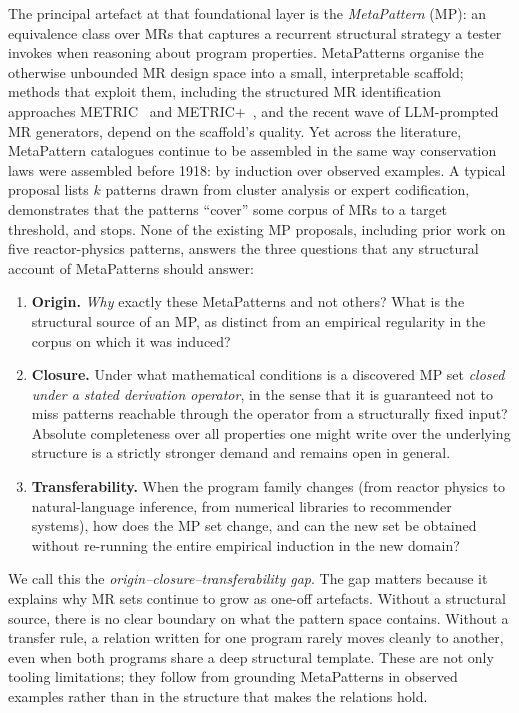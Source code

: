 \documentclass[acmsmall,screen,review]{acmart}
\begin{document}
The principal artefact at that foundational layer is the \emph{MetaPattern} (MP): an equivalence class over MRs that captures a recurrent structural strategy a tester invokes when reasoning about program properties. MetaPatterns organise the otherwise unbounded MR design space into a small, interpretable scaffold; methods that exploit them, including the structured MR identification approaches METRIC~\cite{ChenMETRIC2016} and METRIC+~\cite{SunMETRICplus2021}, and the recent wave of LLM-prompted MR generators, depend on the scaffold's quality. Yet across the literature, MetaPattern catalogues continue to be assembled in the same way conservation laws were assembled before 1918: by induction over observed examples. A typical proposal lists $k$ patterns drawn from cluster analysis or expert codification, demonstrates that the patterns ``cover'' some corpus of MRs to a target threshold, and stops. None of the existing MP proposals, including prior work on five reactor-physics patterns, answers the three questions that any structural account of MetaPatterns should answer:

\begin{enumerate}
  \item \textbf{Origin.} \emph{Why} exactly these MetaPatterns and not others? What is the structural source of an MP, as distinct from an empirical regularity in the corpus on which it was induced?
  \item \textbf{Closure.} Under what mathematical conditions is a discovered MP set \emph{closed under a stated derivation operator}, in the sense that it is guaranteed not to miss patterns reachable through the operator from a structurally fixed input? Absolute completeness over all properties one might write over the underlying structure is a strictly stronger demand and remains open in general.
  \item \textbf{Transferability.} When the program family changes (from reactor physics to natural-language inference, from numerical libraries to recommender systems), how does the MP set change, and can the new set be obtained without re-running the entire empirical induction in the new domain?
\end{enumerate}

We call this the \emph{origin--closure--transferability gap}. The gap matters because it explains why MR sets continue to grow as one-off artefacts. Without a structural source, there is no clear boundary on what the pattern space contains. Without a transfer rule, a relation written for one program rarely moves cleanly to another, even when both programs share a deep structural template. These are not only tooling limitations; they follow from grounding MetaPatterns in observed examples rather than in the structure that makes the relations hold.
\end{document}
